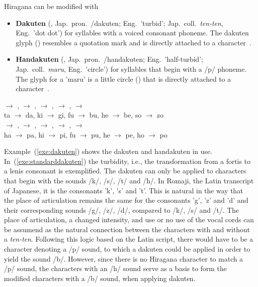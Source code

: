 Hiragana can be modified with
\begin{itemize}

  \item \textbf{Dakuten} (, Jap.\ pron.\ /dakuten;
        Eng.\ 'turbid'; Jap.\ coll.\ \emph{ten-ten}, Eng.\ 'dot dot') for 
        syllables with a voiced consonant phoneme. The dakuten glyph ()  
        resembles a quotation mark and is directly attached to a 
        character~.

  \item \textbf{Handakuten} (,
        Jap.\ pron.\ /handakuten; 
        Eng.\ 'half-turbid'; Jap.\ coll.\ \emph{maru}, Eng.\ 'circle') for 
        syllables that begin 
        with a /p/ phoneme. The glyph for a 'maru' is a little circle ()
        that is directly attached to a character~.

\end{itemize}
\begin{exe}
\ex \label{exe:dakuten}
\begin{xlist}
\ex \label{exe:standarddakuten}
\gll {} $\rightarrow$ ,  $\rightarrow$ ,  $\rightarrow$ ,  $\rightarrow$ ,  $\rightarrow$  \\
ta $\rightarrow$ da, ki $\rightarrow$ gi, fu $\rightarrow$ bu, he $\rightarrow$ be, so $\rightarrow$ zo \\

\ex \label{exe:handakuten}
\gll {} $\rightarrow$ ,  $\rightarrow$ ,  $\rightarrow$ ,  $\rightarrow$ ,  $\rightarrow$  \\
ha $\rightarrow$ pa, hi $\rightarrow$ pi, fu $\rightarrow$ pu, he $\rightarrow$ pe, ho $\rightarrow$ po \\
\end{xlist}
\end{exe}
Example~(\ref{exe:dakuten}) shows the dakuten and handakuten in use. 
In~(\ref{exe:standarddakuten}) the turbidity, i.e., the transformation from a 
fortis to a lenis consonant is exemplified. 
The dakuten can only be applied to characters that begin with the sounds 
/k/, /s/, /t/ and /h/. In Romaji, the Latin transcript of Japanese, it is
the consonants 'k', 's' and 't'. This is natural in the
way that the place of articulation remains the same for the consonants 'g', 'z' 
and 'd' and their corresponding sounds /g/, /z/, /d/, 
compared to /k/, /s/ and /t/.
The place of articulation, a changed intensity, and use or no use of the vocal 
cords can be assumend as the natural connection between the characters with and 
without a \emph{ten-ten}. 
Following this logic based on the Latin script, 
there would have to be a character denoting a /p/ sound,
to which a dakuten could be applied in order to yield the sound /b/.
However, since there is no Hiragana character to match a /p/ sound,
the characters with an /h/ sound serve as a basis to form the modified 
characters with a /b/ sound, when applying dakuten.

